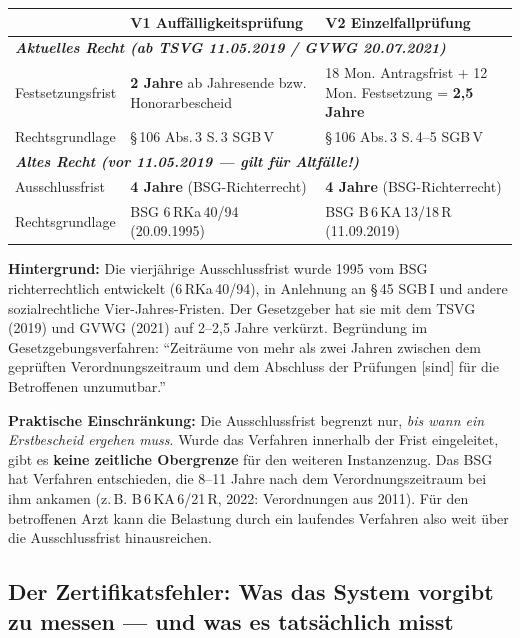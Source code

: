 \documentclass{umbruch-position}
\begin{document}
{\small
\begin{tabularx}{\textwidth}{l X X}
\toprule
 & \textbf{V1 Auffälligkeitsprüfung} & \textbf{V2 Einzelfallprüfung} \\
\midrule
\multicolumn{3}{l}{\textit{\textbf{Aktuelles Recht (ab TSVG 11.05.2019 / GVWG 20.07.2021)}}} \\
\addlinespace[2pt]
Festsetzungsfrist & \textbf{2 Jahre} ab Jahresende bzw. Honorarbescheid & 18 Mon. Antragsfrist + 12 Mon. Festsetzung = \textbf{2,5 Jahre} \\
\addlinespace
Rechtsgrundlage & \S\,106 Abs.\,3 S.\,3 SGB\,V & \S\,106 Abs.\,3 S.\,4--5 SGB\,V \\
\midrule
\multicolumn{3}{l}{\textit{\textbf{Altes Recht (vor 11.05.2019 --- gilt für Altfälle!)}}} \\
\addlinespace[2pt]
Ausschlussfrist & \textbf{4 Jahre} (BSG-Richterrecht) & \textbf{4 Jahre} (BSG-Richterrecht) \\
\addlinespace
Rechtsgrundlage & BSG 6\,RKa\,40/94 (20.09.1995) & BSG B\,6\,KA\,13/18\,R (11.09.2019) \\
\bottomrule
\end{tabularx}
}

\medskip

\textbf{Hintergrund:} Die vierjährige Ausschlussfrist wurde 1995 vom BSG richterrechtlich entwickelt (6\,RKa\,40/94), in Anlehnung an \S\,45 SGB\,I und andere sozialrechtliche Vier-Jahres-Fristen. Der Gesetzgeber hat sie mit dem TSVG (2019) und GVWG (2021) auf 2--2,5 Jahre verkürzt. Begründung im Gesetzgebungsverfahren: ``Zeiträume von mehr als zwei Jahren zwischen dem geprüften Verordnungszeitraum und dem Abschluss der Prüfungen [sind] für die Betroffenen unzumutbar.''

\textbf{Praktische Einschränkung:} Die Ausschlussfrist begrenzt nur, \textit{bis wann ein Erstbescheid ergehen muss}. Wurde das Verfahren innerhalb der Frist eingeleitet, gibt es \textbf{keine zeitliche Obergrenze} für den weiteren Instanzenzug. Das BSG hat Verfahren entschieden, die 8--11 Jahre nach dem Verordnungszeitraum bei ihm ankamen (z.\,B. B\,6\,KA\,6/21\,R, 2022: Verordnungen aus 2011). Für den betroffenen Arzt kann die Belastung durch ein laufendes Verfahren also weit über die Ausschlussfrist hinausreichen.

\subsection{Der Zertifikatsfehler: Was das System vorgibt zu messen --- und was es tatsächlich misst}
\end{document}
